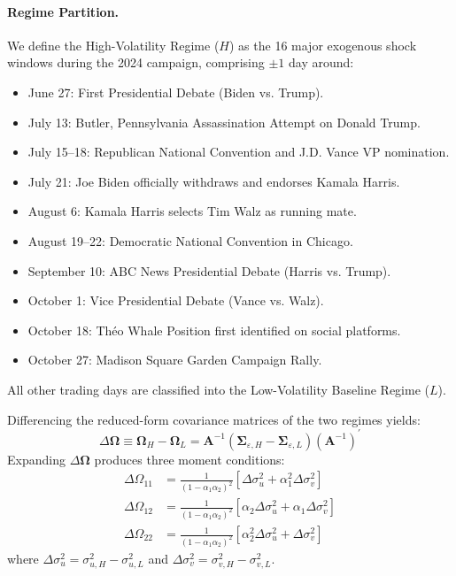 \documentclass[12pt, a4paper]{article}
\begin{document}
\paragraph{Regime Partition.}
We define the High-Volatility Regime ($H$) as the 16 major exogenous shock windows during the 2024 campaign, comprising $\pm 1$ day around:
\begin{itemize}
    \item June 27: First Presidential Debate (Biden vs. Trump).
    \item July 13: Butler, Pennsylvania Assassination Attempt on Donald Trump.
    \item July 15--18: Republican National Convention and J.D. Vance VP nomination.
    \item July 21: Joe Biden officially withdraws and endorses Kamala Harris.
    \item August 6: Kamala Harris selects Tim Walz as running mate.
    \item August 19--22: Democratic National Convention in Chicago.
    \item September 10: ABC News Presidential Debate (Harris vs. Trump).
    \item October 1: Vice Presidential Debate (Vance vs. Walz).
    \item October 18: Th\'eo Whale Position first identified on social platforms.
    \item October 27: Madison Square Garden Campaign Rally.
\end{itemize}
All other trading days are classified into the Low-Volatility Baseline Regime ($L$).

Differencing the reduced-form covariance matrices of the two regimes yields:
\begin{equation}
\Delta \mathbf{\Omega} \equiv \mathbf{\Omega}_H - \mathbf{\Omega}_L = \mathbf{A}^{-1} \left( \mathbf{\Sigma}_{\varepsilon, H} - \mathbf{\Sigma}_{\varepsilon, L} \right) (\mathbf{A}^{-1})^\prime
\end{equation}
Expanding $\Delta \mathbf{\Omega}$ produces three moment conditions:
\begin{align}
\Delta \Omega_{11} &= \frac{1}{(1 - \alpha_1 \alpha_2)^2} \left[ \Delta \sigma_u^2 + \alpha_1^2 \Delta \sigma_v^2 \right] \label{eq:rig1} \\
\Delta \Omega_{12} &= \frac{1}{(1 - \alpha_1 \alpha_2)^2} \left[ \alpha_2 \Delta \sigma_u^2 + \alpha_1 \Delta \sigma_v^2 \right] \label{eq:rig2} \\
\Delta \Omega_{22} &= \frac{1}{(1 - \alpha_1 \alpha_2)^2} \left[ \alpha_2^2 \Delta \sigma_u^2 + \Delta \sigma_v^2 \right] \label{eq:rig3}
\end{align}
where $\Delta \sigma_u^2 = \sigma_{u, H}^2 - \sigma_{u, L}^2$ and $\Delta \sigma_v^2 = \sigma_{v, H}^2 - \sigma_{v, L}^2$. 
\end{document}
